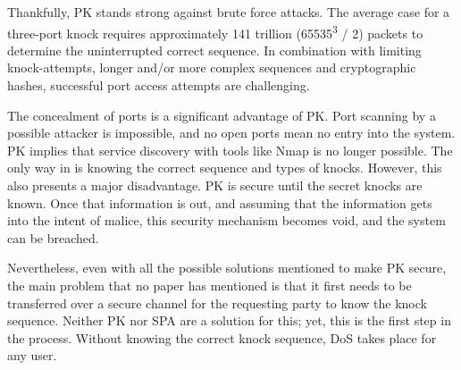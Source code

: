 Thankfully, PK stands strong against brute force attacks.  The average case for a three-port knock requires approximately 141 trillion (65535\textsuperscript{3} / 2) \cite{portwiki} packets to determine the uninterrupted correct sequence.  In combination with limiting knock-attempts, longer and/or more complex sequences and cryptographic hashes, successful port access attempts are challenging.\\\par

The concealment of ports is a significant advantage of PK.  Port scanning by a possible attacker is impossible, and no open ports mean no entry into the system.  PK implies that service discovery with tools like Nmap is no longer possible.  The only way in is knowing the correct sequence and types of knocks.  However, this also presents a major disadvantage.  PK is secure until the secret knocks are known.  Once that information is out, and assuming that the information gets into the intent of malice, this security mechanism becomes void, and the system can be breached.\par
Nevertheless, even with all the possible solutions mentioned to make PK secure, the main problem that no paper has mentioned is that it first needs to be transferred over a secure channel for the requesting party to know the knock sequence.  Neither PK nor SPA are a solution for this; yet, this is the first step in the process.  Without knowing the correct knock sequence, DoS takes place for any user.\\\par

